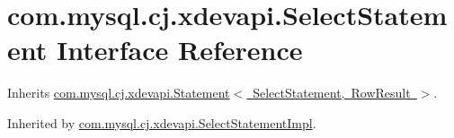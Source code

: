\hypertarget{interfacecom_1_1mysql_1_1cj_1_1xdevapi_1_1_select_statement}{}\section{com.\+mysql.\+cj.\+xdevapi.\+Select\+Statement Interface Reference}
\label{interfacecom_1_1mysql_1_1cj_1_1xdevapi_1_1_select_statement}


Inherits \mbox{\hyperlink{interfacecom_1_1mysql_1_1cj_1_1xdevapi_1_1_statement}{com.\+mysql.\+cj.\+xdevapi.\+Statement$<$ Select\+Statement, Row\+Result $>$}}.



Inherited by \mbox{\hyperlink{classcom_1_1mysql_1_1cj_1_1xdevapi_1_1_select_statement_impl}{com.\+mysql.\+cj.\+xdevapi.\+Select\+Statement\+Impl}}.

